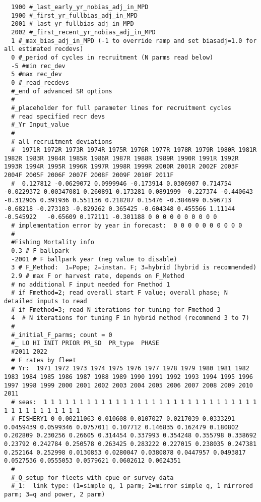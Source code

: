 \begin{landscape}
{\begin{verbatim}
  1900 #_last_early_yr_nobias_adj_in_MPD
  1900 #_first_yr_fullbias_adj_in_MPD
  2001 #_last_yr_fullbias_adj_in_MPD
  2002 #_first_recent_yr_nobias_adj_in_MPD
  1 #_max_bias_adj_in_MPD (-1 to override ramp and set biasadj=1.0 for all estimated recdevs)
  0 #_period of cycles in recruitment (N parms read below)
  -5 #min rec_dev
  5 #max rec_dev
  0 #_read_recdevs
  #_end of advanced SR options
  #
  #_placeholder for full parameter lines for recruitment cycles
  # read specified recr devs
  #_Yr Input_value
  #
  # all recruitment deviations
  #  1971R 1972R 1973R 1974R 1975R 1976R 1977R 1978R 1979R 1980R 1981R 1982R 1983R 1984R 1985R 1986R 1987R 1988R 1989R 1990R 1991R 1992R 1993R 1994R 1995R 1996R 1997R 1998R 1999R 2000R 2001R 2002F 2003F 2004F 2005F 2006F 2007F 2008F 2009F 2010F 2011F
  #  0.127812 -0.0629072 0.0999946 -0.173914 0.0306907 0.714754 -0.0229372 0.00347081 0.260891 0.173281 0.0891999 -0.227374 -0.440643 -0.312905 0.391936 0.551136 0.218287 0.15476 -0.384699 0.596713 -0.68218 -0.273103 -0.829262 0.365425 -0.604348 0.455566 1.11144 -0.545922   -0.65609 0.172111 -0.301188 0 0 0 0 0 0 0 0 0 0
  # implementation error by year in forecast:  0 0 0 0 0 0 0 0 0 0
  #
  #Fishing Mortality info 
  0.3 # F ballpark
  -2001 # F ballpark year (neg value to disable)
  3 # F_Method:  1=Pope; 2=instan. F; 3=hybrid (hybrid is recommended)
  2.9 # max F or harvest rate, depends on F_Method
  # no additional F input needed for Fmethod 1
  # if Fmethod=2; read overall start F value; overall phase; N detailed inputs to read
  # if Fmethod=3; read N iterations for tuning for Fmethod 3
  4  # N iterations for tuning F in hybrid method (recommend 3 to 7)
  #
  #_initial_F_parms; count = 0
  #_ LO HI INIT PRIOR PR_SD  PR_type  PHASE
  #2011 2022
  # F rates by fleet
  # Yr:  1971 1972 1973 1974 1975 1976 1977 1978 1979 1980 1981 1982 1983 1984 1985 1986 1987 1988 1989 1990 1991 1992 1993 1994 1995 1996 1997 1998 1999 2000 2001 2002 2003 2004 2005 2006 2007 2008 2009 2010 2011
  # seas:  1 1 1 1 1 1 1 1 1 1 1 1 1 1 1 1 1 1 1 1 1 1 1 1 1 1 1 1 1 1 1 1 1 1 1 1 1 1 1 1 1
  # FISHERY1 0 0.00211063 0.010608 0.0107027 0.0217039 0.0333291 0.0459439 0.0599346 0.0757011 0.107712 0.146835 0.162479 0.180802 0.202809 0.230256 0.26605 0.314454 0.337993 0.354248 0.355798 0.338692 0.23792 0.242784 0.250578 0.263425 0.283222 0.227015 0.238035 0.247381   0.252164 0.252998 0.0130853 0.0280047 0.0380878 0.0447957 0.0493817 0.0527536 0.0555053 0.0579621 0.0602612 0.0624351
  #
  #_Q_setup for fleets with cpue or survey data
  #_1:  link type: (1=simple q, 1 parm; 2=mirror simple q, 1 mirrored parm; 3=q and power, 2 parm)

\end{verbatim}}
\end{landscape}
